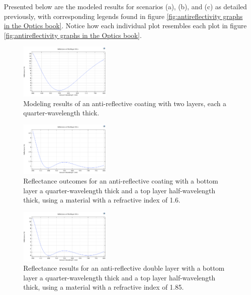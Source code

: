Presented below are the modeled results for scenarios (a), (b), and (c) as detailed previously, with corresponding legends found in figure \ref{fig:antireflectivity graphs in the Optics book}. Notice how each individual plot resembles each plot in figure \ref{fig:antireflectivity graphs in the Optics book}.

\begin{figure}[ht!]
  \centering
  \includegraphics[width=0.4\textwidth]{Chapters/Figures/Chapter 4 Figures/Antireflective Figure a.png}
  \caption{Modeling results of an anti-reflective coating with two layers, each a quarter-wavelength thick.}
  \label{fig:Antireflective Figure a}
\end{figure}

\begin{figure}[ht!]
  \centering
  \includegraphics[width=0.4\textwidth]{Chapters/Figures/Chapter 4 Figures/Antireflective Figure b.png}
  \caption{Reflectance outcomes for an anti-reflective coating with a bottom layer a quarter-wavelength thick and a top layer half-wavelength thick, using a material with a refractive index of 1.6.}
  \label{fig:Antireflective Figure b}
\end{figure}

\begin{figure}[ht!]
  \centering
  \includegraphics[width=0.4\textwidth]{Chapters/Figures/Chapter 4 Figures/Antireflective Figure c.png}
  \caption{Reflectance results for an anti-reflective double layer with a bottom layer a quarter-wavelength thick and a top layer half-wavelength thick, using a material with a refractive index of 1.85.}
  \label{fig:Antireflective Figure c}
\end{figure}

